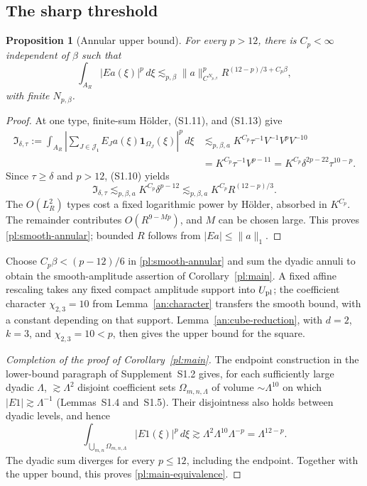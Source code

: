 \documentclass[11pt]{amsart}
\newtheorem{proposition}[theorem]{Proposition}
\theoremstyle{definition}
\theoremstyle{remark}
\numberwithin{equation}{section}
\begin{document}
\subsection{The sharp threshold}\label{pl:upper-bound}
\begin{proposition}[Annular upper bound]\label{pl:annular-proposition}
For every $p>12$, there is $C_p<\infty$ independent of $\beta$ such that
\begin{equation}\label{pl:smooth-annular}
\int_{A_R}|Ea(\xi)|^p\,d\xi\lesssim_{p,\beta} \|a\|_{C^{N_{p,\beta}}}^pR^{(12-p)/3+C_p\beta},
\end{equation}
with finite $N_{p,\beta}$.
\end{proposition}
\begin{proof}
At one type, finite-sum H\"older, \textup{(S1.11)}, and \textup{(S1.13)} give
\begin{equation}\label{pl:scale-count}
\begin{split}
\mathfrak I_{\delta,\tau}:=\int_{A_R}\left|\sum_{J\in\mathcal J_{\mathfrak t}}E_Ja(\xi)\mathbf1_{\Omega_J}(\xi)\right|^p\,d\xi
&\lesssim_{p,\beta,a}K^{C_p}\tau^{-1}V^{-1}V^pV^{-10}\\
&=K^{C_p}\tau^{-1}V^{p-11}=K^{C_p}\delta^{2p-22}\tau^{10-p}.
\end{split}
\end{equation}
Since $\tau\ge\delta$ and $p>12$, \textup{(S1.10)} yields
\begin{equation}\label{pl:annular-bound}
\mathfrak I_{\delta,\tau}\lesssim_{p,\beta,a}K^{C_p}\delta^{p-12}\lesssim_{p,\beta,a}K^{C_p}R^{(12-p)/3}.
\end{equation}
The $O(L_R^2)$ types cost a fixed logarithmic power by H\"older, absorbed in $K^{C_p}$. The remainder contributes $O(R^{9-Mp})$, and $M$ can be chosen large. This proves \eqref{pl:smooth-annular}; bounded $R$ follows from $|Ea|\le\|a\|_1$.
\end{proof}

Choose $C_p\beta<(p-12)/6$ in \eqref{pl:smooth-annular} and sum the dyadic annuli to obtain the smooth-amplitude assertion of Corollary~\ref{pl:main}. A fixed affine rescaling takes any fixed compact amplitude support into $U_{\rm pl}$; the coefficient character $\chi_{2,3}=10$ from Lemma~\ref{an:character} transfers the smooth bound, with a constant depending on that support. Lemma~\ref{an:cube-reduction}, with $d=2$, $k=3$, and $\chi_{2,3}=10<p$, then gives the upper bound for the square.

\begin{proof}[Completion of the proof of Corollary~\ref{pl:main}]
The endpoint construction in the lower-bound paragraph of Supplement~S1.2 gives, for each sufficiently large dyadic $\Lambda$, $\gtrsim\Lambda^2$ disjoint coefficient sets $\Omega_{m,n,\Lambda}$ of volume $\sim\Lambda^{10}$ on which $|E1|\gtrsim\Lambda^{-1}$ (Lemmas~S1.4 and~S1.5). Their disjointness also holds between dyadic levels, and hence
\[
\int_{\bigcup_{m,n}\Omega_{m,n,\Lambda}}|E1(\xi)|^p\,d\xi\gtrsim\Lambda^2\Lambda^{10}\Lambda^{-p}=\Lambda^{12-p}.
\]
The dyadic sum diverges for every $p\le12$, including the endpoint. Together with the upper bound, this proves \eqref{pl:main-equivalence}.
\end{proof}
\end{document}
